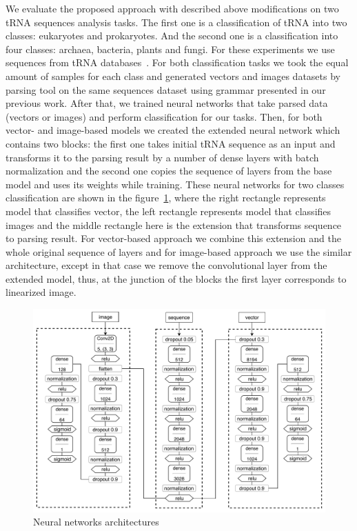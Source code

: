 \documentclass[12pt,a4paper]{cibb}
\begin{document}
We evaluate the proposed approach with described above modifications on two tRNA sequences analysis tasks.
The first one is a classification of tRNA into two classes: eukaryotes and prokaryotes.
And the second one is a classification into four classes: archaea, bacteria, plants and fungi.
For these experiments we use sequences from tRNA databases~\cite{trnadb1,trnadb2}.
For both classification tasks we took the equal amount of samples for each class and generated vectors and images datasets by parsing tool on the same sequences dataset using grammar presented in our previous work.
After that, we trained neural networks that take parsed data (vectors or images) and perform classification for our tasks.
Then, for both vector- and image-based models we created the extended neural network which contains two blocks: the first one takes initial tRNA sequence as an input and transforms it to the parsing result by a number of dense layers with batch normalization and the second one copies the sequence of layers from the base model and uses its weights while training.
These neural networks for two classes classification are shown in the figure~\ref{nn}, where the right rectangle represents model that classifies vector, the left rectangle represents model that classifies images and the middle rectangle here is the extension that transforms sequence to parsing result. For vector-based approach we combine this extension and the whole original sequence of layers and for image-based approach we use the similar architecture, except in that case we remove the convolutional layer from the extended model, thus, at the junction of the blocks the first layer corresponds to linearized image.

\begin{figure}[h]
\begin{center}
\centering
\includegraphics[width=14cm]{nn_arch.pdf}
\caption{Neural networks architectures}
\label{nn}
\end{center}
\end{figure}
\end{document}
